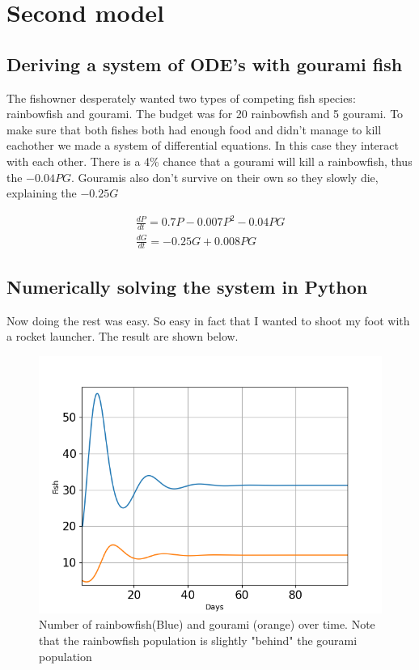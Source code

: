 \section{Second model}

\subsection{Deriving a system of ODE's with gourami fish}
\begin{flushleft}
    The fishowner desperately wanted two types of competing fish species:
    rainbowfish and gourami. The budget was for 20 rainbowfish and 5 gourami.
    To make sure that both fishes both had enough food and didn't manage to kill eachother
    we made a system of differential equations. In this case they interact with each other.
    There is a 4\% chance that a gourami will kill a rainbowfish, thus the $-0.04PG$.
    Gouramis also don't survive on their own so they slowly die, explaining the $-0.25G$
\end{flushleft}

\begin{align*}[left = \empheqlbrace]
    \frac{dP}{dt}= 0.7P-0.007P^2-0.04PG \\
    \frac{dG}{dt} = -0.25G+0.008PG
\end{align*}

\subsection{Numerically solving the system in Python}
\begin{flushleft}
    Now doing the rest was easy. So easy in fact that I wanted to shoot my foot
    with a rocket launcher. The result are shown below.

\end{flushleft}
\begin{figure}[H]
    \includegraphics[scale=0.4]{../figures/Figure_2.png}
    \centering
    \caption{Number of rainbowfish(Blue) and gourami (orange) over time. Note that the
        rainbowfish population is slightly "behind" the gourami population}
    \label{two}
\end{figure}

